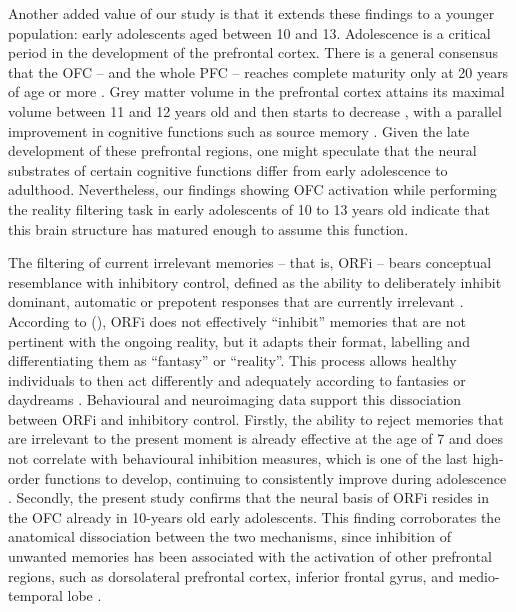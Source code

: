 Another added value of our study is that it extends these findings to a younger population: early adolescents aged between 10 and 13. Adolescence is a critical period in the development of the prefrontal cortex. There is a general consensus that the OFC – and the whole PFC – reaches complete maturity only at 20 years of age or more \citep{Diamond2002, Gogtay2004, Galvan2006}. Grey matter volume in the prefrontal cortex attains its maximal volume between 11 and 12 years old and then starts to decrease \citep{Giedd1999}, with a parallel improvement in cognitive functions such as source memory \citep{Sowell2001}. Given the late development of these prefrontal regions, one might speculate that the neural substrates of certain cognitive functions differ from early adolescence to adulthood. Nevertheless, our findings showing OFC activation while performing the reality filtering task in early adolescents of 10 to 13 years old indicate that this brain structure has matured enough to assume this function. 

The filtering of current irrelevant memories – that is, ORFi – bears conceptual resemblance with inhibitory control, defined as the ability to deliberately inhibit dominant, automatic or prepotent responses that are currently irrelevant \citep{Harnishfeger1995, StClair-Thompson2006}. According to \citeauthor{Schnider2018} (\citeyear{Schnider2018}), ORFi does not effectively  “inhibit” memories that are not pertinent with the ongoing reality, but it adapts their format, labelling and differentiating them as “fantasy” or “reality”. This process allows healthy individuals to then act differently and adequately according to fantasies or daydreams \citep{Nahum2009, Schnider2018}. Behavioural and neuroimaging data support this dissociation between ORFi and inhibitory control. Firstly, the ability to reject memories that are irrelevant to the present moment is already effective at the age of 7 \citep{Liverani2017} and does not correlate with behavioural inhibition measures, which is one of the last high-order functions to develop, continuing to consistently improve during adolescence \cite{Luna2010}. Secondly, the present study confirms that the neural basis of ORFi resides in the OFC already in 10-years old early adolescents. This finding corroborates the anatomical dissociation between the two mechanisms, since inhibition of unwanted memories has been associated with the activation of other prefrontal regions, such as dorsolateral prefrontal cortex, inferior frontal gyrus, and medio-temporal lobe \citep{Anderson2004, Luna2010}. 


